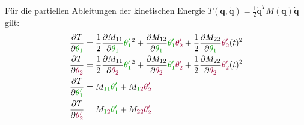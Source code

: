 \documentclass[a4paper, 12pt]{scrartcl}
\newcommand{\gruen}[2][gruen]{\textcolor{#1}{#2}}
\newcommand{\dunkelrot}[2][dunkelrot]{\textcolor{#1}{#2}}
\begin{document}
Für die partiellen Ableitungen der kinetischen Energie 
$T(\textbf{q}, \dot{\textbf{q}}) = \frac{1}{2} \dot{\textbf{q}}^T M(\textbf{q}) \dot{\textbf{q}}$ gilt:
\begin{align*}
    \frac{\partial T}{\partial \gruen{\theta_{1}}}
    &= 
    \frac{1}{2}  \frac{\partial M_{11}}{\partial \gruen{\theta_{1}}} 
    \gruen{\theta_{1}'}^2 
    + \frac{\partial M_{12}}{\partial \gruen{\theta_{1}}} \gruen{\theta_{1}'} 
    \dunkelrot{\theta_{2}'} 
    + \frac{1}{2} \frac{\partial M_{22}}{\partial \gruen{\theta_{1}}} 
    \dunkelrot{\theta_{2}'}(t)^2
    \\
    \frac{\partial T}{\partial \dunkelrot{\theta_{2}}}
    &= 
    \frac{1}{2} \frac{\partial M_{11}}{\partial \dunkelrot{\theta_{2}}} \gruen{\theta_{1}'}^2
    + \frac{\partial M_{12}}{\partial \dunkelrot{\theta_{2}}} \gruen{\theta_{1}'} \dunkelrot{\theta_{2}'} 
    + \frac{1}{2} \frac{\partial M_{22}}{\partial \dunkelrot{\theta_{2}}} \dunkelrot{\theta_{2}'}(t)^2
    \\
    \frac{\partial T}{\partial \gruen{\theta_{1}'}} 
    &= M_{\gruen{1 1}} \gruen{\theta_{1}'} + M_{\gruen{1}\dunkelrot{2}}  \dunkelrot{\theta_{2}'}
    \\
    \frac{\partial T}{\partial \dunkelrot{\theta_{2}'}} 
    &=
    M_{\gruen{1}\dunkelrot{2}} \gruen{\theta_{1}'} + M_{\dunkelrot{22}} \dunkelrot{\theta_{2}'}
\end{align*}
\end{document}
